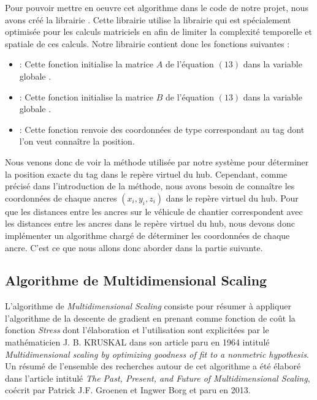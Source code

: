 Pour pouvoir mettre en oeuvre cet algorithme dans le code de notre projet, nous avons créé la librairie {}. Cette librairie utilise la librairie {} qui est spécialement optimisée pour les calculs matriciels en {} afin de limiter la complexité temporelle et spatiale de ces calculs. Notre librairie {} contient donc les fonctions suivantes :

\begin{itemize}
   \item {} : Cette fonction initialise la matrice $A$ de l'équation $(13)$ dans la variable globale {}.
   \item {} : Cette fonction initialise la matrice $B$ de l'équation $(13)$ dans la variable globale {}.
   \item {} : Cette fonction renvoie des coordonnées de type {} correspondant au tag dont l'on veut connaître la position.
\end{itemize}

Nous venons donc de voir la méthode utilisée par notre système pour déterminer la position exacte du tag dans le repère virtuel du hub. Cependant, comme précisé dans l'introduction de la méthode, nous avons besoin de connaître les coordonnées de chaque ancres $(x_i, y_i, z_i)$ dans le repère virtuel du hub. Pour que les distances entre les ancres sur le véhicule de chantier correspondent avec les distances entre les ancres dans le repère virtuel du hub, nous devons donc implémenter un algorithme chargé de déterminer les coordonnées de chaque ancre. C'est ce que nous allons donc aborder dans la partie suivante.

\subsection{Algorithme de Multidimensional Scaling}

L'algorithme de \emph{Multidimensional Scaling} consiste pour résumer à appliquer l'algorithme de la descente de gradient en prenant comme fonction de coût la fonction \emph{Stress} dont l'élaboration et l'utilisation sont explicitées par le mathématicien J. B. KRUSKAL dans son article paru en 1964 intitulé \emph{Multidimensional scaling by optimizing goodness of fit to a nonmetric hypothesis}\cite{mds_ref_1}. Un résumé de l'ensemble des recherches autour de cet algorithme a été élaboré dans l'article intitulé \emph{The Past, Present, and Future of Multidimensional Scaling}, coécrit par Patrick J.F. Groenen et Ingwer Borg et paru en 2013\cite{mds_ref_2}. 

